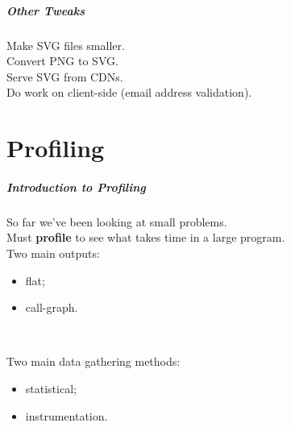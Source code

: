 \documentclass[aspectratio=43]{beamer}
\newenvironment{changemargin}[1]{%
  \begin{list}{}{%
    \setlength{\topsep}{0pt}%
    \setlength{\leftmargin}{#1}%
    \setlength{\rightmargin}{1em}
    \setlength{\listparindent}{\parindent}%
    \setlength{\itemindent}{\parindent}%
    \setlength{\parsep}{\parskip}%
  }%
  \item[]}{\end{list}}
\begin{document}
\begin{frame}
  \frametitle{Other Tweaks}

  \begin{changemargin}{2cm}
    Make SVG files smaller.\\[1em]
    Convert PNG to SVG.\\[1em]
    Serve SVG from CDNs.\\[1em]
    Do work on client-side (email address validation).
  \end{changemargin}
  
\end{frame}


\part{Profiling}
\frame{\partpage}

\begin{frame}
  \frametitle{Introduction to Profiling}

  \begin{changemargin}{2cm}
    So far we've been looking at small problems.\\[1em]
    Must {\bf profile} to see what takes time in a
      large program.\\[1em]
    Two main outputs:
      \begin{itemize}
        \item flat;
        \item call-graph.
      \end{itemize}
~\\[1em]
    \item Two main data gathering methods:
      \begin{itemize}
        \item statistical;
        \item instrumentation.
      \end{itemize}
  \end{changemargin}
\end{frame}
\end{document}
